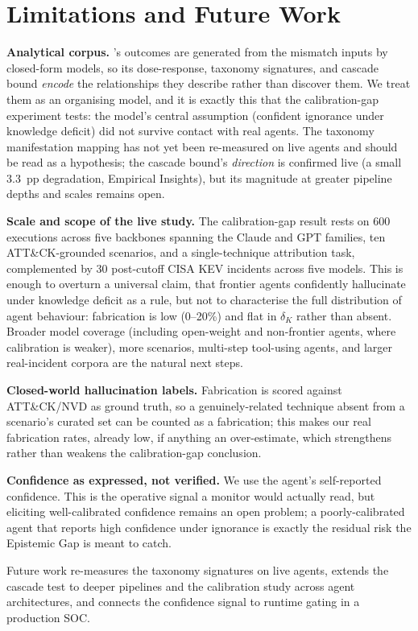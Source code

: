 \section{Limitations and Future Work}

\textbf{Analytical corpus.} \SAFK{}'s outcomes are generated from the
mismatch inputs by closed-form models, so its dose-response, taxonomy
signatures, and cascade bound \textit{encode} the relationships they
describe rather than discover them. We treat them as an organising
model, and it is exactly this that the calibration-gap experiment tests:
the model's central assumption (confident ignorance under knowledge
deficit) did not survive contact with real agents. The taxonomy
manifestation mapping has not yet been re-measured on live agents and
should be read as a hypothesis; the cascade bound's \emph{direction} is
confirmed live (a small $3.3$~pp degradation, Empirical Insights), but its magnitude at
greater pipeline depths and scales remains open.

\textbf{Scale and scope of the live study.} The calibration-gap result
rests on 600 executions across five backbones spanning the Claude and GPT families, ten
ATT\&CK-grounded scenarios, and a single-technique attribution task,
complemented by 30 post-cutoff CISA KEV incidents across five models.
This is enough to overturn a universal claim, that frontier agents
confidently hallucinate under knowledge deficit as a rule, but not to
characterise the full distribution of agent behaviour: fabrication is
low (0--20\%) and flat in $\delta_K$ rather than absent. Broader model
coverage (including open-weight and non-frontier agents, where
calibration is weaker), more scenarios, multi-step tool-using agents,
and larger real-incident corpora are the natural next steps.

\textbf{Closed-world hallucination labels.} Fabrication is scored
against ATT\&CK/NVD as ground truth, so a genuinely-related technique
absent from a scenario's curated set can be counted as a fabrication;
this makes our real fabrication rates, already low, if anything an
over-estimate, which strengthens rather than weakens the calibration-gap
conclusion.

\textbf{Confidence as expressed, not verified.} We use the agent's
self-reported confidence. This is the operative signal a monitor would
actually read, but eliciting well-calibrated confidence remains an open
problem; a poorly-calibrated agent that reports high confidence under
ignorance is exactly the residual risk the Epistemic Gap is meant to
catch.

Future work re-measures the taxonomy signatures on live agents, extends
the cascade test to deeper pipelines and the calibration study across
agent architectures, and connects the confidence signal to runtime
gating in a production SOC.
